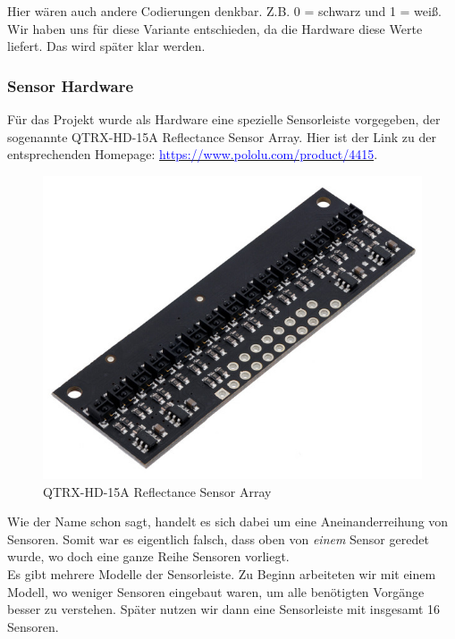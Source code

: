 	 
	 Hier wären auch andere Codierungen denkbar. Z.B. 0 = schwarz und 1 = weiß. Wir haben uns für diese Variante entschieden, da die Hardware diese Werte liefert. Das wird später klar werden.
	 
	\subsubsection{Sensor Hardware}
	 Für das Projekt wurde als Hardware eine spezielle Sensorleiste vorgegeben, der sogenannte QTRX-HD-15A Reflectance Sensor Array. Hier ist der Link zu der entsprechenden Homepage: \href{https://www.pololu.com/product/4415}{\textcolor{blue}{https://www.pololu.com/product/4415}}. 
	
	\begin{figure}[H]
		\centering
		\label{Sensor}
		\includegraphics[scale=0.5]{img/Sensor/Sensor.jpg}
		\caption{QTRX-HD-15A Reflectance Sensor Array \cite{poluluQTRXHD15AReflectanceSensor2021}}
	\end{figure}
	
	Wie der Name schon sagt, handelt es sich dabei um eine Aneinanderreihung von Sensoren. Somit war es eigentlich falsch, dass oben von \emph{einem} Sensor geredet wurde, wo doch eine ganze Reihe Sensoren vorliegt.
	\\
	
	Es gibt mehrere Modelle der Sensorleiste. Zu Beginn arbeiteten wir mit einem Modell, wo weniger Sensoren eingebaut waren, um alle benötigten Vorgänge besser zu verstehen. Später nutzen wir dann eine Sensorleiste mit insgesamt 16 Sensoren.\\
	
